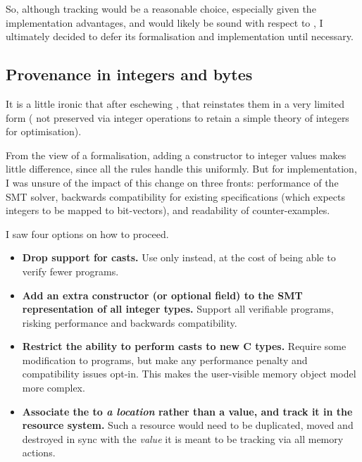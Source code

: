 So, although tracking  would be a reasonable
choice, especially given the implementation advantages, and would likely be
sound with respect to , I ultimately decided to defer its
formalisation and implementation until necessary.

\subsection{Provenance in integers and bytes}\label{subsec:prov-int-bytes}

It is a little ironic that after eschewing , that
 reinstates them in a very limited form (\ie{} not preserved via
integer operations to retain a simple theory of integers for optimisation).

From the view of a formalisation, adding a constructor to integer values makes
little difference, since all the rules handle this uniformly. But for
implementation, I was unsure of the impact of this change on three fronts:
performance of the SMT solver, backwards compatibility for existing
specifications (which expects integers to be mapped to bit-vectors), and
readability of counter-examples.

I saw four options on how to proceed.
\begin{itemize}
    \item \textbf{Drop support for  casts.} Use only
         instead, at the cost of being able
        to verify fewer programs.
    \item \textbf{Add an extra constructor (or optional field) to the SMT
        representation of all integer types.} Support all  verifiable
        programs, risking performance and backwards compatibility.
    \item \textbf{Restrict the ability to perform  casts to new C
        types.} Require some modification to  programs, but
        make any performance penalty and compatibility issues opt-in. This
        makes the user-visible memory object model more complex.\label{sn:optin-typedef}
    \item \textbf{Associate the  to \emph{a location} rather
        than a value, and track it in the resource system.} Such a resource
        would need to be duplicated, moved and destroyed in sync with the
        \emph{value} it is meant to be tracking via all memory actions.
\end{itemize}

